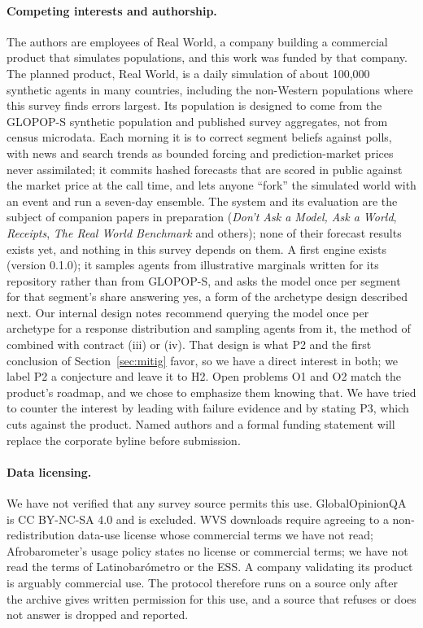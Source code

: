 \documentclass[11pt]{article}
\begin{document}
\paragraph{Competing interests and authorship.} The authors are employees of Real World, a company building a commercial product that simulates populations, and this work was funded by that company. The planned product, Real World, is a daily simulation of about 100,000 synthetic agents in many countries, including the non-Western populations where this survey finds errors largest. Its population is designed to come from the GLOPOP-S synthetic population and published survey aggregates, not from census microdata. Each morning it is to correct segment beliefs against polls, with news and search trends as bounded forcing and prediction-market prices never assimilated; it commits hashed forecasts that are scored in public against the market price at the call time, and lets anyone ``fork'' the simulated world with an event and run a seven-day ensemble. The system and its evaluation are the subject of companion papers in preparation (\emph{Don't Ask a Model, Ask a World}, \emph{Receipts}, \emph{The Real World Benchmark} and others); none of their forecast results exists yet, and nothing in this survey depends on them. A first engine exists (version 0.1.0); it samples agents from illustrative marginals written for its repository rather than from GLOPOP-S, and asks the model once per segment for that segment's share answering yes, a form of the archetype design described next. Our internal design notes recommend querying the model once per archetype for a response distribution and sampling agents from it, the method of \citet{chopra2024archetypes} combined with contract (iii) or (iv). That design is what P2 and the first conclusion of Section~\ref{sec:mitig} favor, so we have a direct interest in both; we label P2 a conjecture and leave it to H2. Open problems O1 and O2 match the product's roadmap, and we chose to emphasize them knowing that. We have tried to counter the interest by leading with failure evidence and by stating P3, which cuts against the product. Named authors and a formal funding statement will replace the corporate byline before submission.

\paragraph{Data licensing.} We have not verified that any survey source permits this use. GlobalOpinionQA is CC BY-NC-SA 4.0 and is excluded. WVS downloads require agreeing to a non-redistribution data-use license whose commercial terms we have not read; Afrobarometer's usage policy states no license or commercial terms; we have not read the terms of Latinobar\'ometro or the ESS. A company validating its product is arguably commercial use. The protocol therefore runs on a source only after the archive gives written permission for this use, and a source that refuses or does not answer is dropped and reported.
\end{document}

